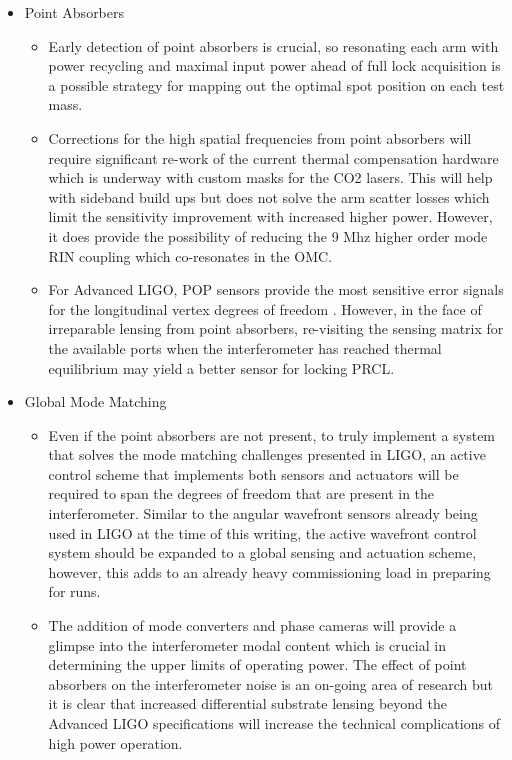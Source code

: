\begin{itemize}
	\item Point Absorbers
	\begin{itemize}
		\item Early detection of point absorbers is crucial, so resonating each arm with power recycling and maximal input power ahead of full lock acquisition is a possible strategy for mapping out the optimal spot position on each test mass.
		\item Corrections for the high spatial frequencies from point absorbers will require significant re-work of the current thermal compensation hardware which is underway with custom masks for the CO2 lasers. This will help with sideband build ups but does not solve the arm scatter losses which limit the sensitivity improvement with increased higher power.  However, it does provide the possibility of reducing the 9 Mhz higher order mode RIN coupling which co-resonates in the OMC.
		\item For Advanced LIGO, POP sensors provide the most sensitive error signals for the longitudinal vertex degrees of freedom \cite{kiwamu_freq1}\cite{kiwamu_freq2}\cite{kiwamu_freq3}. However, in the face of irreparable lensing from point absorbers, re-visiting the sensing matrix for the available ports when the interferometer has reached thermal equilibrium may yield a better sensor for locking PRCL.
	\end{itemize}
	\item Global Mode Matching
	\begin{itemize}		
		\item Even if the point absorbers are not present, to truly implement a system that solves the mode matching challenges presented in LIGO, an active control scheme that implements both sensors and actuators will be required to span the degrees of freedom that are present in the interferometer.  Similar to the angular wavefront sensors already being used in LIGO at the time of this writing, the active wavefront control system should be expanded to a global sensing and actuation scheme, however, this adds to an already heavy commissioning load in preparing for runs.
		\item The addition of mode converters and phase cameras will provide a glimpse into the interferometer modal content which is crucial in determining the upper limits of operating power. The effect of point absorbers on the interferometer noise is an on-going area of research but it is clear that increased differential substrate lensing beyond the Advanced LIGO specifications will increase the technical complications of high power operation. 

\end{itemize}
\end{itemize}
